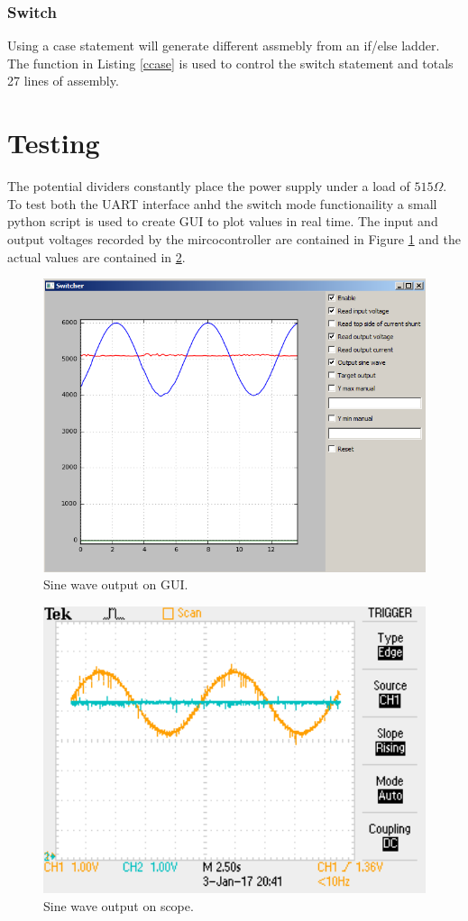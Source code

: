 \documentclass[12pt]{article}%
\begin{document}
\subsubsection{Switch}

Using a case statement will generate different assmebly from an if/else ladder. The function in Listing \ref{ccase} is used to control the switch statement and totals 27 lines of assembly.


\section{Testing}

The potential dividers constantly place the power supply under a load of $515\Omega$. To test both the UART interface anhd the switch mode functionaility a small python script is used to create GUI to plot values in real time. The input and output voltages recorded by the mircocontroller are contained in Figure \ref{fig:gui} and the actual values are contained in \ref{fig:scope}.

\begin{figure}[H]
	\centering
  	\includegraphics[width=12cm]{gui.png}
  	\caption{Sine wave output on GUI.}
  	\label{fig:gui}
\end{figure}

\begin{figure}[H]
	\centering
  	\includegraphics[width=12cm]{scope.png}
  	\caption{Sine wave output on scope.}
  	\label{fig:scope}
\end{figure}
\end{document}
